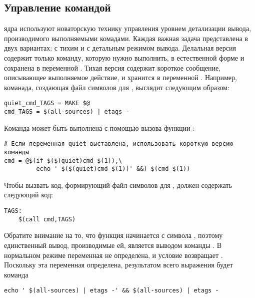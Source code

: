 
\subsection{Управление командой }
\label{sec:managing_command_echo}
 ядра используют новаторскую технику управления уровнем
детализации вывода, производимого выполняемыми комадами. Каждая важная
задача представлена в двух вариантах: с тихим и с детальным режимом
вывода. Делальная версия содержит только команду, которую нужно
выполнить, в естественной форме и сохранена в переменной
. Тихая версия содержит короткое
сообщение, описывающее выполняемое действие, и хранится в переменной
. Например, команада, создающая
файл символов для , выглядит следующим образом:

\begin{verbatim}
quiet_cmd_TAGS = MAKE $@
cmd_TAGS = $(all-sources) | etags -
\end{verbatim}

Команда может быть выполнена с помощью вызова функции :

\begin{verbatim}
# Если переменная quiet выставлена, использовать короткую версию команды
cmd = @$(if $($(quiet)cmd_$(1)),\
         echo ' $($(quiet)cmd_$(1))' &&) $(cmd_$(1))
\end{verbatim}

Чтобы вызвать код, формирующий файл символов для ,
\Makefile{} должен содержать следующий код:

\begin{verbatim}
TAGS:
    $(call cmd,TAGS)
\end{verbatim}

Обратите внимание на то, что функция  начинается с символа
\Monospace{@}, поэтому единственный вывод, производимые ей, является
выводом команды \command{echo}. В нормальном режиме переменная
 не определена, и условие
 возвращает .
Поскольку эта переменная определена, результатом всего выражения будет
команда

\begin{verbatim}
echo ' $(all-sources) | etags -' && $(all-sources) | etags -
\end{verbatim}

